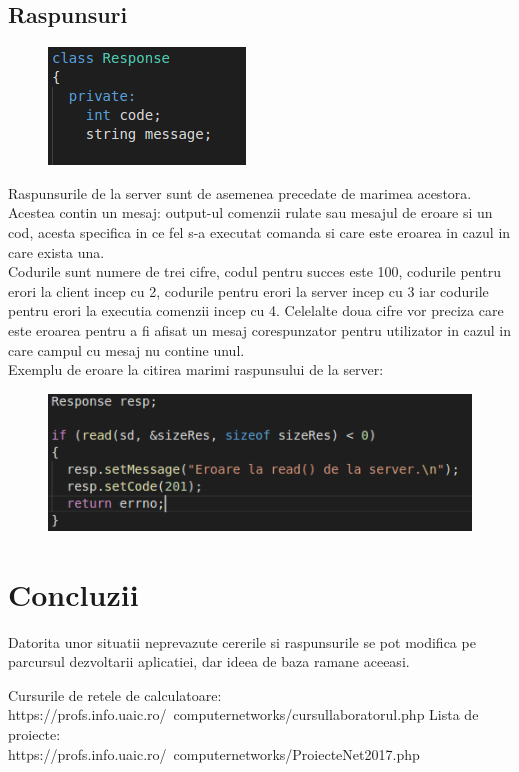 \documentclass{llncs}
\begin{document}
\subsection{Raspunsuri}
\begin{figure}
\includegraphics[width=0.4\linewidth]{response.png}
\end{figure}

Raspunsurile de la server sunt de asemenea precedate de marimea acestora. Acestea contin un mesaj: output-ul comenzii rulate sau mesajul de eroare si un cod, acesta specifica in ce fel s-a executat comanda si care este eroarea in cazul in care exista una.\\

Codurile sunt numere de trei cifre, codul pentru succes este 100, codurile pentru erori la client incep cu 2, codurile pentru erori la server incep cu 3 iar codurile pentru erori la executia comenzii incep cu 4. Celelalte doua cifre vor preciza care este eroarea pentru a fi afisat un mesaj corespunzator pentru utilizator in cazul in care campul cu mesaj nu contine unul.\\

Exemplu de eroare la citirea marimi raspunsului de la server:

\begin{figure}
\includegraphics[width=\linewidth]{exerr.png}
\end{figure}

%
\section{Concluzii}
Datorita unor situatii neprevazute cererile si raspunsurile se pot modifica pe parcursul dezvoltarii aplicatiei, dar ideea de baza ramane aceeasi.\\
%

\begin{thebibliography}{}
%
Cursurile de retele de calculatoare: \\https://profs.info.uaic.ro/~computernetworks/cursullaboratorul.php
Lista de proiecte: \\https://profs.info.uaic.ro/~computernetworks/ProiecteNet2017.php
\end{thebibliography}
\end{document}
